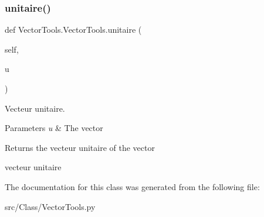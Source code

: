\subsubsection{\texorpdfstring{unitaire()}{unitaire()}}
{\footnotesize\ttfamily def Vector\+Tools.\+Vector\+Tools.\+unitaire (\begin{DoxyParamCaption}\item[{}]{self,  }\item[{}]{u }\end{DoxyParamCaption})}



Vecteur unitaire. 


\begin{DoxyParams}{Parameters}
{\em u} & The vector \\
\hline
\end{DoxyParams}
\begin{DoxyReturn}{Returns}
the vecteur unitaire of the vector \begin{DoxyVerb}vecteur unitaire\end{DoxyVerb}
 
\end{DoxyReturn}


The documentation for this class was generated from the following file\+:\begin{DoxyCompactItemize}
\item 
src/\+Class/Vector\+Tools.\+py\end{DoxyCompactItemize}
